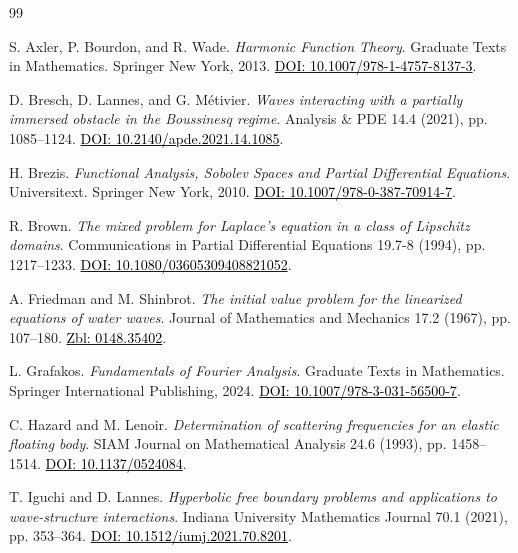 \documentclass{amsart} %
\numberwithin{equation}{section}
\theoremstyle{definition}
\begin{document}
\begin{thebibliography}{99}
\setlength{\itemsep}{2pt}

 S. Axler, P. Bourdon, and R. Wade. \textit{Harmonic Function Theory}. Graduate Texts in Mathematics. Springer New York, 2013. \href{https://doi.org/10.1007/978-1-4757-8137-3}{\textcolor{black}{DOI: 10.1007/978-1-4757-8137-3}}.

 D. Bresch, D. Lannes, and G. M\'etivier. \textit{Waves interacting with a partially immersed obstacle in the Boussinesq regime}. Analysis \& PDE 14.4 (2021), pp. 1085--1124. \href{https://doi.org/10.2140/apde.2021.14.1085}{\textcolor{black}{DOI: 10.2140/apde.2021.14.1085}}.

 H. Brezis. \textit{Functional Analysis, Sobolev Spaces and Partial Differential Equations}. Universitext. Springer New York, 2010. \href{https://doi.org/10.1007/978-0-387-70914-7}{\textcolor{black}{DOI: 10.1007/978-0-387-70914-7}}.

 R. Brown. \textit{The mixed problem for Laplace's equation in a class of Lipschitz domains}. Communications in Partial Differential Equations 19.7-8 (1994), pp. 1217--1233. \href{https://doi.org/10.1080/03605309408821052}{\textcolor{black}{DOI: 10.1080/03605309408821052}}.

 A. Friedman and M. Shinbrot. \textit{The initial value problem for the linearized equations of water waves}. Journal of Mathematics and Mechanics 17.2 (1967), pp. 107--180. \href{https://zbmath.org/0148.35402}{\textcolor{black}{Zbl: 0148.35402}}.

 L. Grafakos. \textit{Fundamentals of Fourier Analysis}. Graduate Texts in Mathematics. Springer International Publishing, 2024. \href{https://doi.org/10.1007/978-3-031-56500-7}{\textcolor{black}{DOI: 10.1007/978-3-031-56500-7}}.

 C. Hazard and M. Lenoir. \textit{Determination of scattering frequencies for an elastic floating body}. SIAM Journal on Mathematical Analysis 24.6 (1993), pp. 1458--1514. \href{https://doi.org/10.1137/0524084}{\textcolor{black}{DOI: 10.1137/0524084}}.

 T. Iguchi and D. Lannes. \textit{Hyperbolic free boundary problems and applications to wave-structure interactions}. Indiana University Mathematics Journal 70.1 (2021), pp. 353--364. \href{https://doi.org/10.1512/iumj.2021.70.8201}{\textcolor{black}{DOI: 10.1512/iumj.2021.70.8201}}.


\end{thebibliography}
\end{document}
